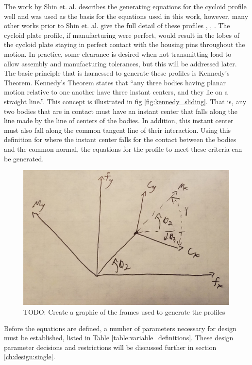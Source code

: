 The work by Shin et. al. \cite{ref:on_the_lobe} describes the generating equations for the cycloid profile well and was used as the basis for the equations used in this work, however, many other works prior to Shin et. al. give the full detail of these profiles \cite{ref:malhorta_2}, \cite{ref:hwang_hsieh}, \cite{ref:design_and_application}.
The cycloid plate profile, if manufacturing were perfect, would result in the lobes of the cycloid plate staying in perfect contact with the housing pins throughout the motion. In practice, some clearance is desired when not transmitting load to allow assembly and manufacturing tolerances, but this will be addressed later. The basic principle that is harnessed to generate these profiles is Kennedy's Theorem. Kennedy's Theorem states that ``any three bodies having planar motion relative to one another have three instant centers, and they lie on a straight line.''\cite{ref:kinematics_and_dynamics}. This concept is illustrated in fig \ref{fig:kennedy_sliding}. That is, any two bodies that are in contact must have an instant center that falls along the line made by the line of centers of the bodies. In addition, this instant center must also fall along the common tangent line of their interaction. Using this definition for where the instant center falls for the contact between the bodies and the common normal, the equations for the profile to meet these criteria can be generated. 

\begin{figure}[h]
   \centering
   \includegraphics[width=0.60\linewidth]{fig/single_frames_TODO}
   \caption{TODO: Create a graphic of the frames used to generate the profiles}
   \label{fig:single_frames}
\end{figure}

Before the equations are defined, a number of parameters necessary for design must be established, listed in Table \ref{table:variable_definitions}. 
These design parameter decisions and restrictions will be discussed further in section \ref{ch:design:single}. 

